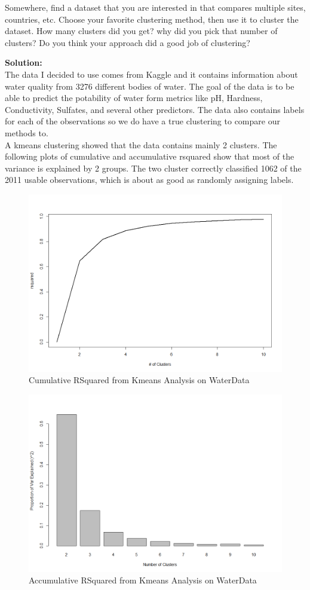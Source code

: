 \documentclass[12pt]{article}
\makeatletter
\theoremstyle{homework}
\newenvironment{exercise}[1]
{\def\@currentlabel{#1}\exercisecore}
{\endexercisecore}
\newcommand{\localhead}[1]{\par\smallskip\noindent\textbf{#1}\nobreak\\}%
\newcommand\solution{\localhead{Solution:}}
\makeatother
\begin{document}
\begin{exercise}{5} Somewhere, find a dataset that you are interested in that compares multiple sites, countries, etc. Choose your favorite clustering method, 
  then use it to cluster the dataset. How many clusters did you get? why did you pick that number of clusters? Do you think your approach did a good job of clustering?\\
  \solution The data I decided to use comes from Kaggle and it contains information about water quality from 3276 different bodies of water. The goal of the data is to be able to predict the 
  potability of water form metrics like pH, Hardness, Conductivity, Sulfates, and several other predictors. The data also contains labels for each of the observations so we do have 
  a true clustering to compare our methods to. \\
  A kmeans clustering showed that the data contains mainly 2 clusters. The following plots of cumulative and accumulative rsquared show that most of the variance 
  is explained by 2 groups. The two cluster correctly classified 1062 of the 2011 usable observations, which is about as good as randomly assigning labels. 
  \begin{figure}[H]
    \begin{center}
      \caption{Cumulative RSquared from Kmeans Analysis on WaterData}
    \includegraphics[width = .70\textwidth]{Rplot13.png}
    \end{center}
\end{figure}
\begin{figure}[H]
  \begin{center}
    \caption{Accumulative RSquared from Kmeans Analysis on WaterData}
  \includegraphics[width = .70\textwidth]{Rplot14.png}

\end{center}
\end{figure}
\end{exercise}
\end{document}
